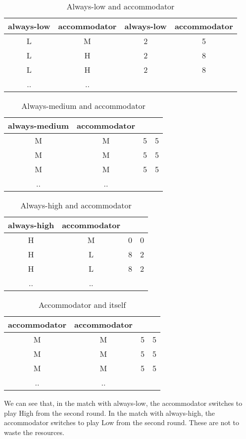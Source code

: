 \documentclass[12.5pt]{report}
\begin{document}
\begin{table}[h!]
\center
\begin{tabular}{cc|cc}
always-low & accommodator & always-low & accommodator\\
\hline
L & M & 2 & 5 \\
L & H & 2 & 8 \\
L & H & 2 & 8 \\
.. & ..\\
\end{tabular}
\caption{Always-low and accommodator}
\end{table}

\begin{table}[h!]
\center
\begin{tabular}{cc|cc}
always-medium & accommodator & & \\
\hline
M & M & 5 & 5 \\
M & M & 5 & 5 \\
M & M & 5 & 5 \\
.. & ..\\
\end{tabular}
\caption{Always-medium and accommodator}
\end{table}

\begin{table}[h!]
\center
\begin{tabular}{cc|cc}
always-high & accommodator &  & \\
\hline
H & M & 0 & 0 \\
H & L & 8 & 2 \\
H & L & 8 & 2 \\
.. & ..\\
\end{tabular}
\caption{Always-high and accommodator}
\end{table}

\begin{table}[h!]
\center
\begin{tabular}{cc|cc}
accommodator & accommodator &  & \\
\hline
M & M & 5 & 5 \\
M & M & 5 & 5 \\
M & M & 5 & 5 \\
.. & ..\\
\end{tabular}
\caption{Accommodator and itself}
\end{table}

We can see that, in the match with always-low, the accommodator switches to play High from the second round. In the match with always-high, the accommodator switches to play Low from the second round. These are not to waste the resources.
\end{document}

